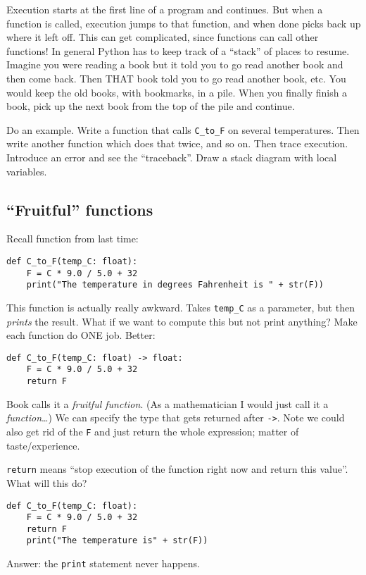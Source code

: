 \documentclass{article}
\begin{document}
Execution starts at the first line of a program and continues.  But
when a function is called, execution jumps to that function, and when
done picks back up where it left off.  This can get complicated, since
functions can call other functions!  In general Python has to keep
track of a ``stack'' of places to resume.  Imagine you were reading a
book but it told you to go read another book and then come back.  Then
THAT book told you to go read another book, etc.  You would keep the
old books, with bookmarks, in a pile.  When you finally finish a book,
pick up the next book from the top of the pile and continue.

Do an example. Write a function that calls \verb|C_to_F| on several
temperatures.  Then write another function which does that twice, and
so on.  Then trace execution.  Introduce an error and see the
``traceback''.  Draw a stack diagram with local variables.

\subsection*{``Fruitful'' functions}

Recall function from last time:
\begin{verbatim}
def C_to_F(temp_C: float):
    F = C * 9.0 / 5.0 + 32
    print("The temperature in degrees Fahrenheit is " + str(F))
\end{verbatim}
This function is actually really awkward.  Takes \verb|temp_C| as a
parameter, but then \emph{prints} the result.  What if we want to
compute this but not print anything?  Make each function do ONE job.
Better:
\begin{verbatim}
def C_to_F(temp_C: float) -> float:
    F = C * 9.0 / 5.0 + 32
    return F
\end{verbatim}
Book calls it a \emph{fruitful function}.  (As a mathematician I would
just call it a \emph{function}\dots) We can specify the type that gets
returned after \verb|->|.  Note we could also get rid of the
\verb|F| and just return the whole expression; matter of
taste/experience.

\verb|return| means ``stop execution of the function right now and
return this value''.  What will this do?

\begin{verbatim}
def C_to_F(temp_C: float):
    F = C * 9.0 / 5.0 + 32
    return F
    print("The temperature is" + str(F))
\end{verbatim}

Answer: the \verb|print| statement never happens.
\end{document}
